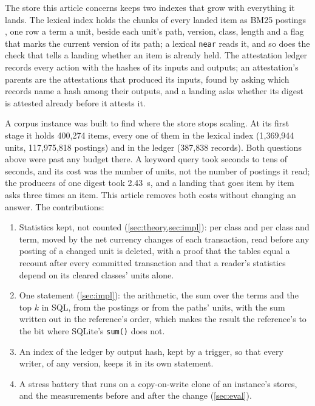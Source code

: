 \documentclass[11pt]{article}
\theoremstyle{plain}
\theoremstyle{definition}
\theoremstyle{remark}
\newcommand{\code}[1]{\texttt{#1}}
\newcommand{\nItems}{400{,}274}
\newcommand{\nUnits}{1{,}369{,}944}
\newcommand{\nPostings}{117{,}975{,}818}
\newcommand{\nRecords}{387{,}838}
\newcommand{\ledgerBefore}{2.43}
\begin{document}
The store this article concerns keeps two indexes that grow with everything it lands. The lexical
index holds the chunks of every landed item as BM25 postings \citep{robertson2009bm25}, one row a
term a unit, beside each unit's path, version, class, length and a flag that marks the current
version of its path; a lexical \code{near} reads it, and so does the check that tells a landing
whether an item is already held. The attestation ledger records every action with the hashes of
its inputs and outputs; an attestation's parents are the attestations that produced its inputs,
found by asking which records name a hash among their outputs, and a landing asks whether its
digest is attested already before it attests it.

A corpus instance was built to find where the store stops scaling. At its first stage it holds
\nItems{} items, every one of them in the lexical index (\nUnits{} units, \nPostings{} postings)
and in the ledger (\nRecords{} records). Both questions above were past any budget there. A keyword
query took seconds to tens of seconds, and its cost was the number of units, not the number of
postings it read; the producers of one digest took \ledgerBefore{}~s, and a landing that goes item
by item asks three times an item. This article removes both costs without changing an answer.
The contributions:

\begin{enumerate}
\item Statistics kept, not counted (\cref{sec:theory,sec:impl}): per class and per class and term,
  moved by the net currency changes of each transaction, read before any posting of a changed unit
  is deleted, with a proof that the tables equal a recount after every committed transaction and
  that a reader's statistics depend on its cleared classes' units alone.
\item One statement (\cref{sec:impl}): the arithmetic, the sum over the terms and the top $k$ in
  SQL, from the postings or from the paths' units, with the sum written out in the reference's
  order, which makes the result the reference's to the bit where SQLite's \code{sum()} does not.
\item An index of the ledger by output hash, kept by a trigger, so that every writer, of any
  version, keeps it in its own statement.
\item A stress battery that runs on a copy-on-write clone of an instance's stores, and the
  measurements before and after the change (\cref{sec:eval}).
\end{enumerate}
\end{document}

